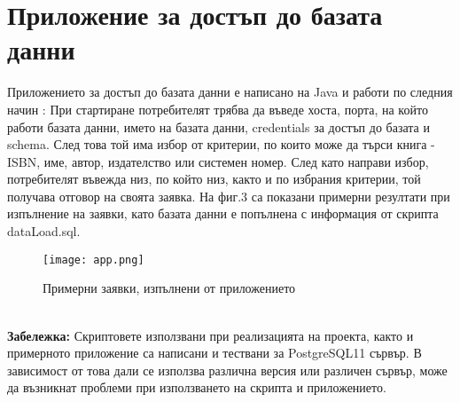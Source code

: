 \documentclass[11pt,a4paper]{article}
\begin{document}
\section {Приложение за достъп до базата данни}
Приложението за достъп до базата данни е написано на Java и работи по следния начин : При стартиране потребителят трябва да въведе хоста, порта, на който работи базата данни, името на базата данни, credentials за достъп до базата и schema. След това той има избор от критерии, по които може да търси книга - ISBN, име, автор, издателство или системен номер. След като направи избор, потребителят въвежда низ, по който низ, както и по избрания критерии, той получава отговор на своята заявка. На фиг.3 са показани примерни резултати при изпълнение на заявки, като базата данни е попълнена с информация от скрипта dataLoad.sql.\\
\begin{figure}[]
\hspace{-70pt}
\texttt{[image: app.png]}
\caption{Примерни заявки, изпълнени от приложението}
\end{figure}
\\
\textbf{Забележка: } Скриптовете използвани при реализацията на проекта, както и примерното приложение са написани и тествани за PostgreSQL11 сървър. В зависимост от това дали се използва различна версия или различен сървър, може да възникнат проблеми при използването на скрипта и приложението.
\end{document}

